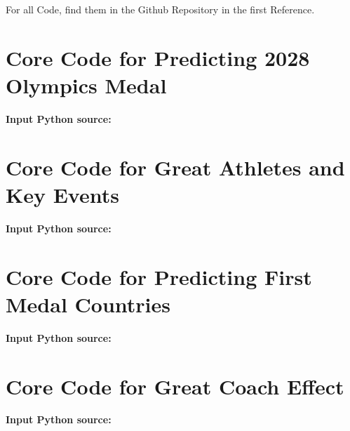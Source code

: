 \begin{appendices}

        For all Code, find them in the Github Repository in the first Reference.

    \section{Core Code for Predicting 2028 Olympics Medal}

    \textbf{\textcolor[rgb]{0.98,0.00,0.00}{Input Python source:}}
    

    \section{Core Code for Great Athletes and Key Events}
    \textbf{\textcolor[rgb]{0.98,0.00,0.00}{Input Python source:}}
    


    \section{Core Code for Predicting First Medal Countries}
    
    \textbf{\textcolor[rgb]{0.98,0.00,0.00}{Input Python source:}}
    


    \section{Core Code for Great Coach Effect}

    \textbf{\textcolor[rgb]{0.98,0.00,0.00}{Input Python source:}}
    

    
\end{appendices}
    